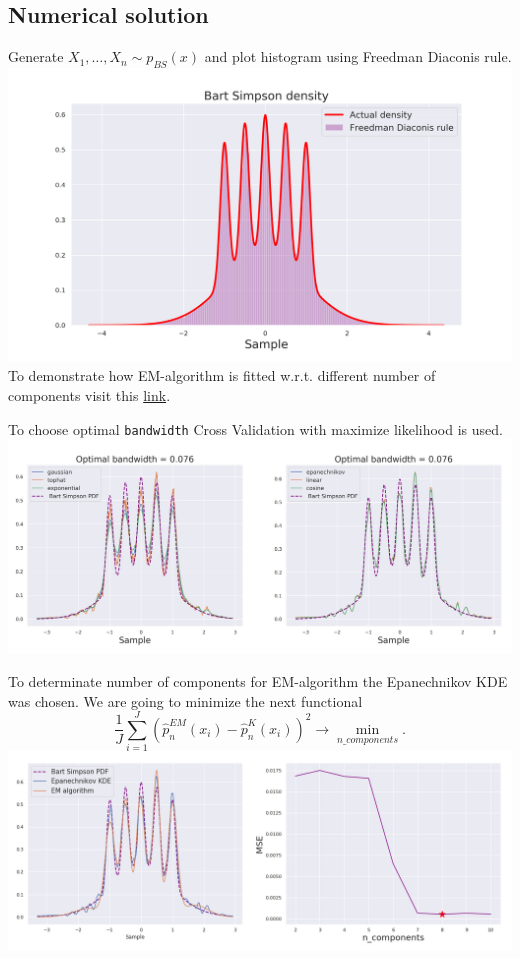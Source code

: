 \documentclass[a4paper, 12pt]{article}
\begin{document}
\subsection{Numerical solution}
Generate $X_1, \ldots, X_n \sim p_{BS}(x)$ and plot histogram using Freedman Diaconis rule. 
\includegraphics[width=\textwidth]{Images/Task3_1.png}
To demonstrate how EM-algorithm is fitted w.r.t. different number of components visit this \href{https://github.com/vitomania/ozon/blob/master/stats/hw2/Images/Task3_2.gif}{link}.

To choose optimal \texttt{bandwidth} Cross Validation with maximize likelihood is used.\\ 
\includegraphics[width=\textwidth]{Images/Task3_3.png}

To determinate number of components for EM-algorithm the Epanechnikov KDE was chosen. We are going to minimize the next functional
$$
\dfrac{1}{J} \sum \limits_{i=1}^J (\hat{p}_n^{EM}(x_i) - \hat{p}_n^{K}(x_i))^2 \rightarrow \min \limits_{n\_components}.
$$
\includegraphics[width=\textwidth]{Images/Task3_4.png}
\end{document}
